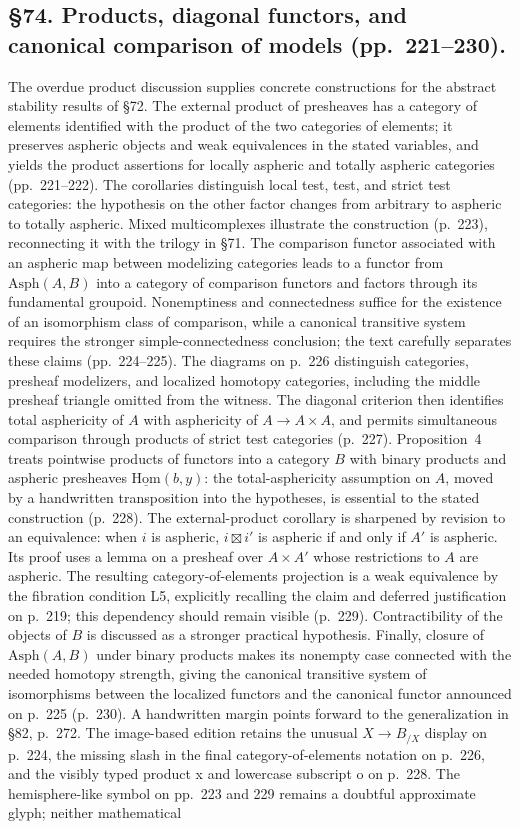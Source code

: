 \documentclass[10pt,oneside]{book}
\begin{document}
\subsection*{\S74. Products, diagonal functors, and canonical comparison of models (pp.\ 221--230).}
The overdue product discussion supplies concrete constructions for the abstract stability results of \S72. The external product of presheaves has a category of elements identified with the product of the two categories of elements; it preserves aspheric objects and weak equivalences in the stated variables, and yields the product assertions for locally aspheric and totally aspheric categories (pp.\ 221--222). The corollaries distinguish local test, test, and strict test categories: the hypothesis on the other factor changes from arbitrary to aspheric to totally aspheric. Mixed multicomplexes illustrate the construction (p.\ 223), reconnecting it with the trilogy in \S71. The comparison functor associated with an aspheric map between modelizing categories leads to a functor from $\mathrm{Asph}(A,B)$ into a category of comparison functors and factors through its fundamental groupoid. Nonemptiness and connectedness suffice for the existence of an isomorphism class of comparison, while a canonical transitive system requires the stronger simple-connectedness conclusion; the text carefully separates these claims (pp.\ 224--225). The diagrams on p.\ 226 distinguish categories, presheaf modelizers, and localized homotopy categories, including the middle presheaf triangle omitted from the witness. The diagonal criterion then identifies total asphericity of $A$ with asphericity of $A\to A\times A$, and permits simultaneous comparison through products of strict test categories (p.\ 227). Proposition~4 treats pointwise products of functors into a category $B$ with binary products and aspheric presheaves $\underline{\mathrm{Hom}}(b,y)$: the total-asphericity assumption on $A$, moved by a handwritten transposition into the hypotheses, is essential to the stated construction (p.\ 228). The external-product corollary is sharpened by revision to an equivalence: when $i$ is aspheric, $i\boxtimes i'$ is aspheric if and only if $A'$ is aspheric. Its proof uses a lemma on a presheaf over $A\times A'$ whose restrictions to $A$ are aspheric. The resulting category-of-elements projection is a weak equivalence by the fibration condition L5, explicitly recalling the claim and deferred justification on p.\ 219; this dependency should remain visible (p.\ 229). Contractibility of the objects of $B$ is discussed as a stronger practical hypothesis. Finally, closure of $\mathrm{Asph}(A,B)$ under binary products makes its nonempty case connected with the needed homotopy strength, giving the canonical transitive system of isomorphisms between the localized functors and the canonical functor announced on p.\ 225 (p.\ 230). A handwritten margin points forward to the generalization in \S82, p.\ 272. The image-based edition retains the unusual $X\longrightarrow B_{/X}$ display on p.\ 224, the missing slash in the final category-of-elements notation on p.\ 226, and the visibly typed product x and lowercase subscript o on p.\ 228. The hemisphere-like symbol on pp.\ 223 and 229 remains a doubtful approximate glyph; neither mathematical 
\end{document}
